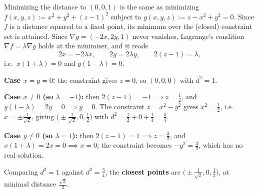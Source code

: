 \begin{exercisesolution}
\label{sol:closest_point_hyperbolic_paraboloid}
Minimizing the distance to $(0,0,1)$ is the same as minimizing
$f(x,y,z) := x^2+y^2+(z-1)^2$ subject to $g(x,y,z) := z-x^2+y^2 = 0$. Since $f$ is a distance
squared to a fixed point, its minimum over the (closed) constraint set is attained. Since
$\nabla g = (-2x,2y,1)$ never vanishes, Lagrange's condition $\nabla f = \lambda \nabla g$ holds
at the minimiser, and it reads
\[2x = -2\lambda x, \qquad 2y = 2\lambda y, \qquad 2(z-1) = \lambda,\]
i.e.\ $x(1+\lambda) = 0$ and $y(1-\lambda) = 0$.

\textbf{Case $x=y=0$:} the constraint gives $z=0$, so $(0,0,0)$ with $d^2 = 1$.

\textbf{Case $x \neq 0$ (so $\lambda=-1$):} then $2(z-1)=-1 \implies z = \tfrac12$, and $y(1-\lambda)=2y=0
\implies y=0$. The constraint $z=x^2-y^2$ gives $x^2=\tfrac12$, i.e.\ $x=\pm\tfrac{1}{\sqrt2}$,
giving $\big(\pm\tfrac{1}{\sqrt2},0,\tfrac12\big)$ with $d^2 = \tfrac12+0+\tfrac14 = \tfrac34$.

\textbf{Case $y \neq 0$ (so $\lambda=1$):} then $2(z-1)=1 \implies z=\tfrac32$, and $x(1+\lambda)=2x=0
\implies x=0$; the constraint becomes $-y^2 = \tfrac32$, which has no real solution.

Comparing $d^2=1$ against $d^2=\tfrac34$, the \textbf{closest points} are
$\big(\pm\tfrac{1}{\sqrt2},0,\tfrac12\big)$, at minimal distance $\tfrac{\sqrt3}{2}$.
\end{exercisesolution}


